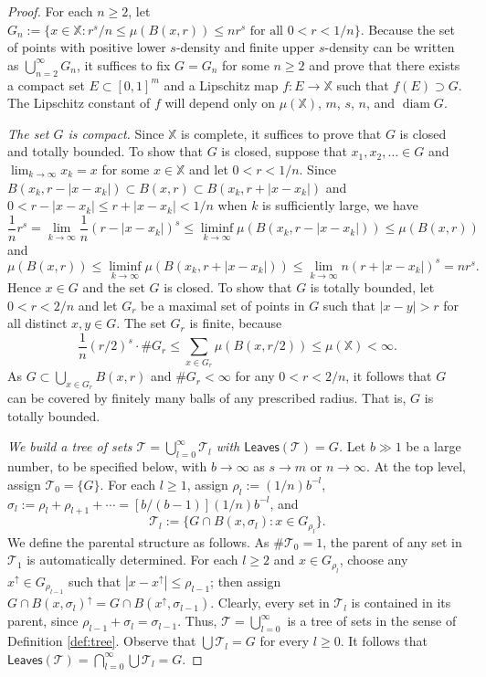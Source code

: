 \documentclass[12pt]{amsart}
\theoremstyle{definition}
\theoremstyle{remark}
\newcommand{\XX}{\mathbb{X}}
\newcommand{\diam}{\mathop\mathrm{diam}\nolimits}
\newcommand{\leaves}{\mathsf{Leaves}}
\numberwithin{figure}{section}
\numberwithin{equation}{section}
\begin{document}
\begin{proof} For each $n\geq 2$, let $G_n:=\{x\in\XX: r^s/n\leq \mu(B(x,r))\leq nr^s\text{ for all }0<r<1/n\}$. Because the set of points with positive lower $s$-density and finite upper $s$-density can be written as $\bigcup_{n=2}^\infty G_n$, it suffices to fix $G=G_n$ for some $n\geq 2$ and prove that there exists a compact set $E\subset[0,1]^m$ and a Lipschitz map $f:E\rightarrow\XX$ such that $f(E)\supset G$. The Lipschitz constant of $f$ will depend only on $\mu(\XX)$, $m$, $s$, $n$, and $\diam G$.

\emph{The set $G$ is compact.} Since $\XX$ is complete, it suffices to prove that $G$ is closed and totally bounded. To show that $G$ is closed, suppose that $x_1,x_2,\dots\in G$ and $\lim_{k\rightarrow\infty} x_k=x$ for some $x\in \XX$ and let $0<r<1/n$. Since $B(x_k,r-|x-x_k|)\subset B(x,r)\subset B(x_k,r+|x-x_k|)$ and $0<r-|x-x_k|\leq r+|x-x_k|<1/n$ when $k$ is sufficiently large, we have \begin{equation*}\frac{1}{n}r^s = \lim_{k\rightarrow\infty} \frac{1}{n}(r-|x-x_k|)^s\leq \liminf_{k\rightarrow\infty} \mu(B(x_k,r-|x-x_k|))\leq \mu(B(x,r))\end{equation*} and \begin{equation*} \mu(B(x,r)) \leq \liminf_{k\rightarrow\infty} \mu(B(x_k,r+|x-x_k|))\leq \lim_{k\rightarrow\infty} n(r+|x-x_k|)^s=nr^s.\end{equation*} Hence $x\in G$ and the set $G$ is closed. To show that $G$ is totally bounded, let $0<r<2/n$ and let $G_r$ be a maximal set of points in $G$ such that $|x-y|>r$ for all distinct $x,y\in G$. The set $G_r$ is finite, because $$\frac{1}{n}\left(r/2\right)^s\cdot\#G_r \leq \sum_{x\in G_r} \mu\left(B\left(x,r/2\right)\right)\leq \mu(\XX)<\infty.$$  As $G\subset \bigcup_{x\in G_r} B(x,r)$ and $\#G_r<\infty$ for any $0<r<2/n$, it follows that $G$ can be covered by finitely many balls of any prescribed radius. That is, $G$ is totally bounded.

\emph{We build a tree of sets $\mathcal{T}=\bigcup_{l=0}^\infty \mathcal{T}_l$ with $\leaves(\mathcal{T})=G$.} Let $b\gg 1$ be a large number, to be specified below, with $b\rightarrow\infty$ as $s\rightarrow m$ or $n\rightarrow\infty$. At the top level, assign $\mathcal{T}_0=\{G\}$. For each $l\geq 1$, assign $\rho_l:=(1/n)b^{-l}$, $\sigma_l:=\rho_l+\rho_{l+1}+\cdots=[b/(b-1)](1/n)b^{-l}$, and $$\mathcal{T}_l:=\{G\cap B(x,\sigma_l):x\in G_{\rho_l}\}.$$ We define the parental structure as follows. As $\#\mathcal{T}_0=1$, the parent of any set in $\mathcal{T}_1$ is automatically determined. For each $l\geq 2$ and $x\in G_{\rho_l}$, choose any $x^\uparrow\in G_{\rho_{l-1}}$ such that $|x-x^\uparrow|\leq \rho_{l-1}$; then assign $G\cap B(x,\sigma_l)^\uparrow = G\cap B(x^\uparrow,\sigma_{l-1})$. Clearly, every set in $\mathcal{T}_l$ is contained in its parent, since $\rho_{l-1}+\sigma_l=\sigma_{l-1}$. Thus, $\mathcal{T}=\bigcup_{l=0}^\infty$ is a tree of sets in the sense of Definition \ref{def:tree}. Observe that $\bigcup\mathcal{T}_l=G$ for every $l\geq 0$. It follows that $\leaves(\mathcal{T})=\bigcap_{l=0}^\infty \bigcup\mathcal{T}_l=G$.


\end{proof}
\end{document}
